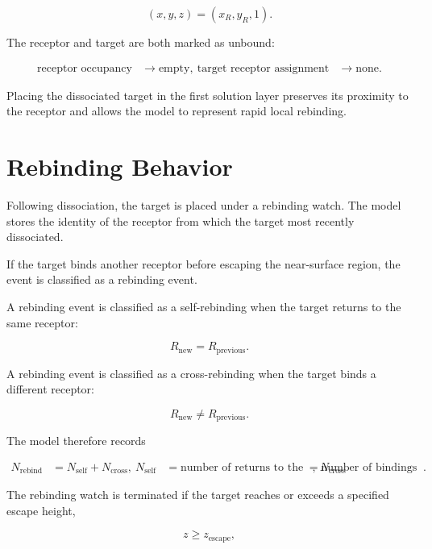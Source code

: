 \documentclass[11pt]{article}
\begin{document}
\begin{equation}
(x,y,z)
=
(x_R,y_R,1).
\end{equation}

The receptor and target are both marked as unbound:

\begin{align}
\text{receptor occupancy} &\rightarrow \text{empty},\
\text{target receptor assignment} &\rightarrow \text{none}.
\end{align}

Placing the dissociated target in the first solution layer preserves its proximity to the receptor and allows the model to represent rapid local rebinding.

\section{Rebinding Behavior}

Following dissociation, the target is placed under a rebinding watch. The model stores the identity of the receptor from which the target most recently dissociated.

If the target binds another receptor before escaping the near-surface region, the event is classified as a rebinding event.

A rebinding event is classified as a self-rebinding when the target returns to the same receptor:

\begin{equation}
R_{\mathrm{new}}
=
R_{\mathrm{previous}}.
\end{equation}

A rebinding event is classified as a cross-rebinding when the target binds a different receptor:

\begin{equation}
R_{\mathrm{new}}
\neq
R_{\mathrm{previous}}.
\end{equation}

The model therefore records

\begin{align}
N_{\mathrm{rebind}}
&=
N_{\mathrm{self}}
+
N_{\mathrm{cross}},\
N_{\mathrm{self}}
&=
\text{number of returns to the original receptor},\
N_{\mathrm{cross}}
&=
\text{number of bindings to a different receptor}.
\end{align}

The rebinding watch is terminated if the target reaches or exceeds a specified escape height,

\begin{equation}
z
\geq
z_{\mathrm{escape}},
\end{equation}
\end{document}
